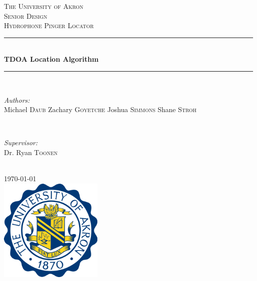\documentclass[12pt]{article}
\begin{document}
\begin{titlepage}
\newcommand{\HRule}{\rule{\linewidth}{0.5mm}}
\center

\textsc{\LARGE The University of Akron}\\[1.5cm]
\textsc{\Large Senior Design}\\[0.5cm]
\textsc{\large Hydrophone Pinger Locator}\\[0.5cm]

\HRule \\[0.4cm]
{ \huge \bfseries TDOA Location Algorithm}\\[0.4cm]
\HRule \\[1.5cm]

\begin{minipage}{0.4\textwidth}
\begin{flushleft} \large
\emph{Authors:}\\
Michael \textsc{Daub}\newline
Zachary \textsc{Goyetche}\newline
Joshua \textsc{Simmons}\newline
Shane \textsc{Stroh}
\end{flushleft}
\end{minipage}
~
\begin{minipage}{0.4\textwidth}
\begin{flushright} \large
\emph{Supervisor:} \\
Dr. Ryan \textsc{Toonen}
\end{flushright}
\end{minipage}\\[2cm]

{\large \today}\\[0.5cm]

\includegraphics[width=5.0cm]{Pics_and_Figs/UA_Seal.png}

\vfill

\end{titlepage}

\end{document}
